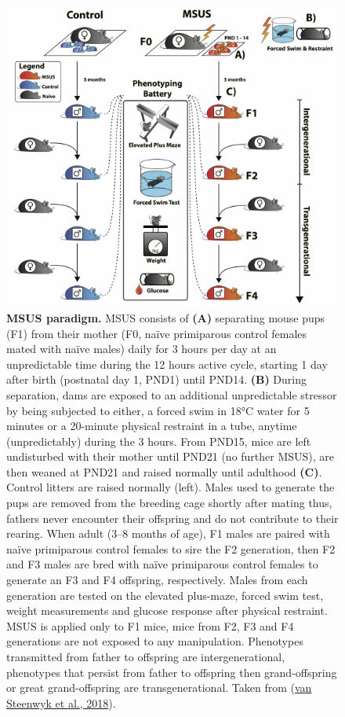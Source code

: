 \documentclass[12pt,twoside]{reedthesis}
\begin{document}
\begin{figure}[H]

{\centering \includegraphics{thesis_files/figure-latex/if4-1} 

}

\caption[MSUS paradigm]{\textbf{MSUS paradigm.} MSUS consists of \textbf{(A)} separating mouse pups (F1) from their mother (F0, naïve primiparous control females mated with naïve males) daily for 3 hours per day at an unpredictable time during the 12 hours active cycle, starting 1 day after birth (postnatal day 1, PND1) until PND14. \textbf{(B)} During separation, dams are exposed to an additional unpredictable stressor by being subjected to either, a forced swim in 18°C water for 5 minutes or a 20-minute physical restraint in a tube, anytime (unpredictably) during the 3 hours. From PND15, mice are left undisturbed with their mother until PND21 (no further MSUS), are then weaned at PND21 and raised normally until adulthood \textbf{(C)}. Control litters are raised normally (left). Males used to generate the pups are removed from the breeding cage shortly after mating thus, fathers never encounter their offspring and do not contribute to their rearing. When adult (3--8 months of age), F1 males are paired with naïve primiparous control females to sire the F2 generation, then F2 and F3 males are bred with naïve primiparous control females to generate an F3 and F4 offspring, respectively. Males from each generation are tested on the elevated plus-maze, forced swim test, weight measurements and glucose response after physical restraint. MSUS is applied only to F1 mice, mice from F2, F3 and F4 generations are not exposed to any manipulation. Phenotypes transmitted from father to offspring are intergenerational, phenotypes that persist from father to offspring then grand-offspring or great grand-offspring are transgenerational. Taken from (\protect\hyperlink{ref-vansteenwyk2018}{van Steenwyk et al., 2018}).}\label{fig:if4}
\end{figure}
\end{document}
